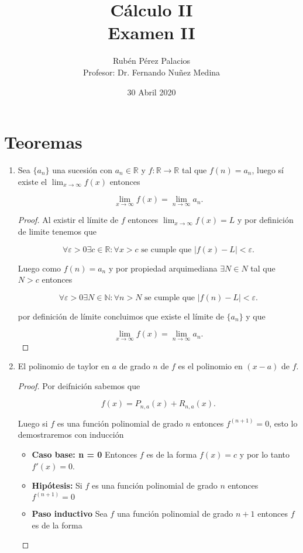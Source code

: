 \documentclass[letterpaper]{article}
\title{Cálculo II\\Examen II}
\author{Rubén Pérez Palacios\\Profesor: Dr. Fernando Nuñez Medina}
\date{30 Abril 2020}
\theoremstyle{definition}
\theoremstyle{lemathm}
\theoremstyle{lemademthm}
\newcommand{\limxinf}{\lim_{x\to\infty}}
\newcommand{\limninf}{\lim_{n\to\infty}}
\newcommand{\N}{\mathbb{N}}
\newcommand{\R}{\mathbb{R}}
\begin{document}
	\maketitle

	\section*{Teoremas}

	\begin{enumerate}
		\item Sea $\{a_n\}$ una sucesión con $a_n \in \R$ y $f: \R \rightarrow \R$ tal que $f(n) = a_n$, luego sí  existe el $\limxinf f(x)$ entonces
		
		\[\limxinf f(x) = \limninf a_n.\]

		\begin{proof}
			Al existir el límite de $f$ entonces $\limxinf f(x) = L$ y por definición de limite tenemos que

			\[\forall \varepsilon > 0 \exists c \in \R : \forall x > c \text{ se cumple que } |f(x) - L| < \varepsilon.\]

			Luego como $f(n) = a_n$ y por propiedad arquimediana $\exists N \in N$ tal que $N > c$ entonces

			\[\forall \varepsilon > 0 \exists N \in \N : \forall n > N \text{ se cumple que } |f(n) - L| < \varepsilon.\]

			por definición de límite concluimos que existe el límite de $\{a_n\}$ y que

			\[\limxinf f(x) = \limninf a_n.\]

		\end{proof}

		\newpage

		\item El polinomio de taylor en $a$ de grado $n$ de $f$ es el polinomio en $(x-a)$ de $f$.
		
		\begin{proof}
			
			Por deifnición sabemos que
			
			\[f(x) = P_{n,a}(x) + R_{n,a}(x).\]
			
			Luego si $f$ es una función polinomial de grado $n$ entonces $f^{(n+1)} = 0$, esto lo demostraremos con inducción
			
			\begin{itemize}
				\item \textbf{Caso base: n = 0}
				Entonces $f$ es de la forma $f(x) = c$ y por lo tanto $f'(x) = 0$.
				\item \textbf{Hipótesis:}
				Si $f$ es una función polinomial de grado $n$ entonces $f^{(n+1)} = 0$	
				\item \textbf{Paso inductivo}
				Sea $f$ una función polinomial de grado $n+1$ entonces $f$ es de la forma 
				

\end{itemize}
\end{proof}
\end{enumerate}
\end{document}
